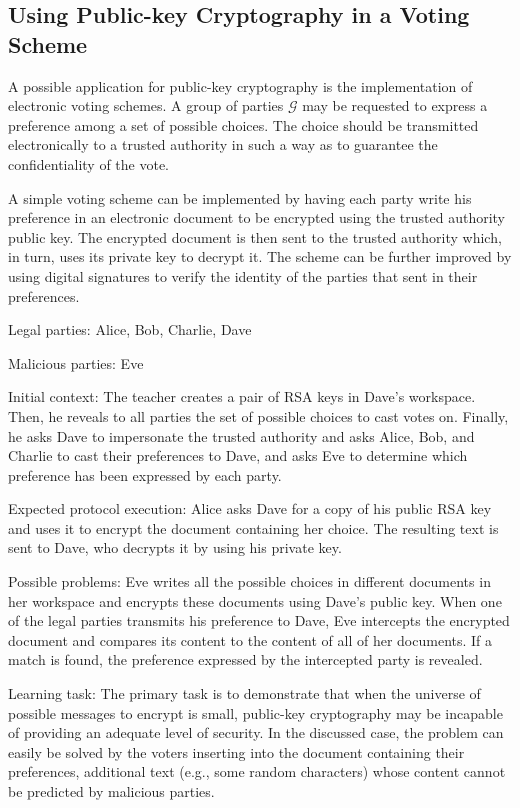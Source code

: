 \documentclass[conference]{IEEEtran}
\begin{document}
\subsection{ Using Public-key Cryptography in a Voting Scheme}

A possible application for public-key cryptography is the
implementation of electronic voting schemes. A group of
parties ${\mathcal G}$ may be requested to express
a preference among a set of possible choices. The choice
should be transmitted electronically to a trusted authority
in such a way as to guarantee the confidentiality of the vote.


A simple voting scheme can be implemented by having each party
write his preference in an electronic document to be encrypted
using the trusted authority public key. The encrypted document
is then sent to the trusted authority which, in turn, uses
its private key to decrypt it. The scheme can be further
improved by using digital signatures to verify the identity of the parties that sent in their preferences.

{\sc Legal parties:} Alice, Bob, Charlie, Dave

{\sc Malicious parties:} Eve

{\sc Initial context:} The teacher creates a pair of RSA keys
in Dave's workspace. Then, he reveals to all parties the set of
possible choices to cast votes on. Finally, he asks Dave to
impersonate the trusted authority and asks Alice, Bob,
and Charlie to cast their preferences to Dave, and asks Eve to determine which preference has been expressed by each party.

{\sc Expected protocol execution:} Alice asks Dave for
a copy of his public RSA key and uses it to encrypt the
document containing her choice. The resulting text is sent to Dave, who decrypts it by using his private key.

{\sc Possible problems:} Eve writes all the possible choices in
different documents in her workspace and encrypts these documents
using Dave's public key. When one of the legal parties transmits
his preference to Dave, Eve intercepts the encrypted document
and compares its content to the content of all of her documents.
If a match is found, the preference expressed by the intercepted party is revealed.

{\sc Learning task:} The primary task is to demonstrate that
when the universe of possible messages to encrypt is small,
public-key cryptography may be incapable of providing an adequate
level of security. In the discussed case, the problem can easily
be solved by the voters inserting into the document
containing their preferences, additional text
(e.g., some random characters) whose content cannot be predicted by malicious parties.
\end{document}
